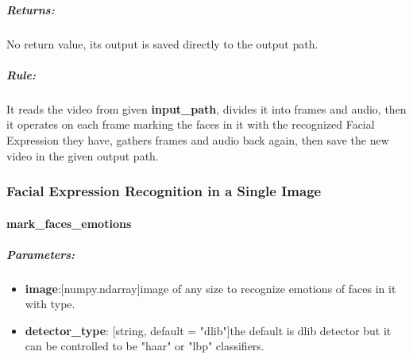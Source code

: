 \subparagraph{Returns:} 
\begin{changemargin}{1cm}{0cm} 
No return value, its output is saved directly to the output path.
\end{changemargin}

\subparagraph{Rule:}
\begin{changemargin}{1cm}{0cm} 
It reads the video from given \textbf{input\_path}, divides it into frames and audio, then it operates on each frame marking the faces in it with the recognized Facial Expression they have, gathers frames and audio back again, then save the new video in the given output path.
\end{changemargin}

\begin{comment}
\subparagraph{Usage:}
\begin{changemargin}{0.5cm}{0cm} 
	\begin{itemize}
		\item import the module:
		\begin{lstlisting}[language=Python]
		from Cerebro.interface Import process_video as pv\end{lstlisting}
		\item call it:
		\begin{lstlisting}[language=Python]
		pv.detect_video_emotion(video_path, output_path, skip,detector_type, verbose)\end{lstlisting}
	\end{itemize}
\end{changemargin}
\end{comment}

\subsubsection{Facial Expression Recognition in a Single Image}
\paragraph{mark\_faces\_emotions}

\subparagraph{Parameters:}
\begin{changemargin}{0.5cm}{0cm}
\begin{itemize}
	\item \textbf{image}:[numpy.ndarray]image of any size to recognize emotions of faces in it with type.
	\item \textbf{detector\_type}: [string, default = "dlib"]the default is dlib detector but it can be controlled to be "haar" or "lbp" classifiers.	
\end{itemize}
\end{changemargin}

